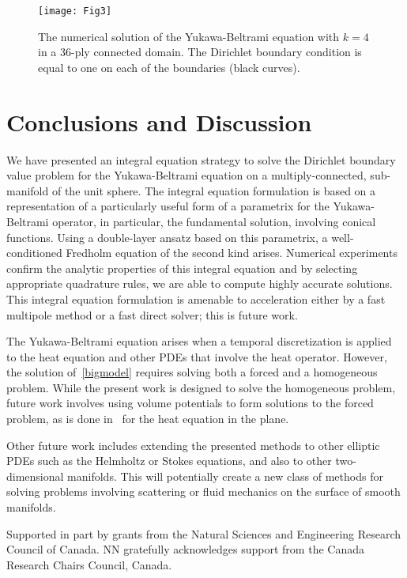 \begin{figure}
  \centering
  \texttt{[image: Fig3]}
  \caption{\label{f:36ply} The numerical solution of the Yukawa-Beltrami
  equation with $k=4$ in a 36-ply connected domain.  The Dirichlet
  boundary condition is equal to one on each of the boundaries (black
  curves).}
\end{figure}

\section{Conclusions and Discussion}
We have presented an integral equation strategy to solve the Dirichlet
boundary value problem for the Yukawa-Beltrami equation on a
multiply-connected, sub-manifold of the unit sphere.  The integral
equation formulation is based on a representation of a particularly
useful form of a parametrix for the Yukawa-Beltrami operator, in
particular, the fundamental solution, involving conical functions.
Using a double-layer ansatz based on this parametrix, a well-conditioned
Fredholm equation of the second kind arises.  Numerical experiments
confirm the analytic properties of this integral equation and by
selecting appropriate quadrature rules, we are able to compute highly
accurate solutions.  This integral equation formulation is amenable to
acceleration either by a fast multipole method or a fast direct solver;
this is future work.  

The Yukawa-Beltrami equation arises when a temporal discretization is
applied to the heat equation and other PDEs that involve the heat
operator.  However, the solution of~\eqref{bigmodel} requires solving
both a forced and a homogeneous problem.  While the present work is
designed to solve the homogeneous problem, future work involves using
volume potentials to form solutions to the forced problem, as is done
in~\cite{rothe:heat} for the heat equation in the plane.

Other future work includes extending the presented methods to other
elliptic PDEs such as the Helmholtz or Stokes equations, and also to
other two-dimensional manifolds.  This will potentially create a new
class of methods for solving problems involving scattering or fluid
mechanics on the surface of smooth manifolds.

\begin{acknowledgements}
Supported in part by grants from the Natural Sciences and Engineering
Research Council of Canada. NN gratefully acknowledges support from the
Canada Research Chairs Council, Canada.
\end{acknowledgements}

